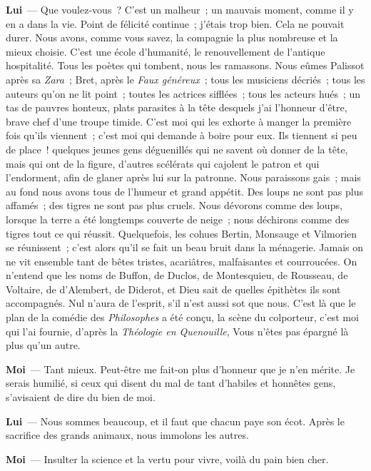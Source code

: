 \documentclass[french,twoside]{book} %
\newcommand{\labelchar}[1]{\textbf{\color{rubric} #1}}
\begin{document}
\labelchar{Lui} — Que voulez-vous ? C’est un malheur ; un mauvais moment, comme il y en a dans la vie. Point de félicité continue ; j’étais trop bien. Cela ne pouvait durer. Nous avons, comme vous savez, la compagnie la plus nombreuse et la mieux choisie. C’est une école d’humanité, le renouvellement de l’antique hospitalité. Tous les poètes qui tombent, nous les ramassons. Nous eûmes Palissot après sa \emph{Zara} ; Bret, après le \emph{Faux généreux} ; tous les musiciens décriés ; tous les auteurs qu’on ne lit point ; toutes les actrices sifflées ; tous les acteurs hués ; un tas de pauvres honteux, plats parasites à la tête desquels j’ai l’honneur d’être, brave chef d’une troupe timide. C’est moi qui les exhorte à manger la première fois qu’ils viennent ; c’est moi qui demande à boire pour eux. Ils tiennent si peu de place ! quelques jeunes gens déguenillés qui ne savent où donner de la tête, mais qui ont de la figure, d’autres scélérats qui cajolent le patron et qui l’endorment, afin de glaner après lui sur la patronne. Nous paraissons gais ; mais au fond nous avons tous de l’humeur et grand appétit. Des loups ne sont pas plus affamés ; des tigres ne sont pas plus cruels. Nous dévorons comme des loups, lorsque la terre a été longtemps couverte de neige ; nous déchirons comme des tigres tout ce qui réussit. Quelquefois, les cohues Bertin, Monsauge et Vilmorien se réunissent ; c’est alors qu’il se fait un beau bruit dans la ménagerie. Jamais on ne vit ensemble tant de bêtes tristes, acariâtres, malfaisantes et courroucées. On n’entend que les noms de Buffon, de Duclos, de Montesquieu, de Rousseau, de Voltaire, de d’Alembert, de Diderot, et Dieu sait de quelles épithètes ils sont accompagnés. Nul n’aura de l’esprit, s’il n’est aussi sot que nous. C’est là que le plan de la comédie des \emph{Philosophes} a été conçu, la scène du colporteur, c’est moi qui l’ai fournie, d’après la \emph{Théologie en Quenouille}, Vous n’êtes pas épargné là plus qu’un autre.\par
\labelchar{Moi} — Tant mieux. Peut-être me fait-on plus d’honneur que je n’en mérite. Je serais humilié, si ceux qui disent du mal de tant d’habiles et honnêtes gens, s’avisaient de dire du bien de moi.\par
\labelchar{Lui} — Nous sommes beaucoup, et il faut que chacun paye son écot. Après le sacrifice des grands animaux, nous immolons les autres.\par
\labelchar{Moi} — Insulter la science et la vertu pour vivre, voilà du pain bien cher.\par
\end{document}
